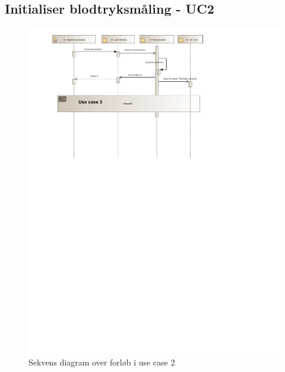 \subsection{Initialiser blodtryksmåling - UC2}
\begin{figure}[H]
\includegraphics[width=\textwidth]{SystemArkitektur/pdfs/SD_UC2-crop.pdf}
\caption{Sekvens diagram over forløb i use case 2}
\end{figure}
\newpage

